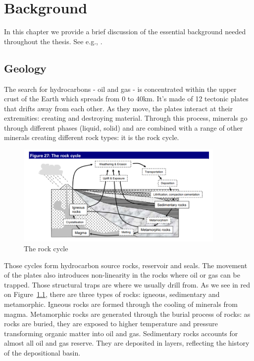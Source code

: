\chapter{Background}
\label{chp:background}

In this chapter we provide a brief discussion of the essential background needed throughout the thesis. See e.g., \cite{Cover2006}.


\section{Geology}
The search for hydrocarbons - oil and gas - is concentrated within the upper crust of the Earth which spreads from 0 to 40km. It's made of 12 tectonic plates that drifts away from each other. As they move, the plates interact at their extremities: creating and destroying material. Through this process, minerals go through different phases (liquid, solid) and are combined with a range of other minerals creating different rock types: it is the rock cycle. 
	\begin{figure}[!htp]
    \centering
        \includegraphics[width=0.9\textwidth]{./figures/02-rock-cycle}
        \caption{The rock cycle}\label{fig:rock-cycle}
    \end{figure}

Those cycles form hydrocarbon source rocks, reservoir and seals. The movement of the plates also introduces non-linearity in the rocks where oil or gas can be trapped. Those structural traps are where we usually drill from. As we see in red on Figure~\ref{fig:rock-cycle}, there are three types of rocks: igneous, sedimentary and metamorphic.  Igneous rocks are formed through the cooling of minerals from magma. Metamorphic rocks are generated through the burial process of rocks: as rocks are buried, they are exposed to higher temperature and pressure transforming organic matter into oil and gas. Sedimentary rocks accounts for almost all oil and gas reserve. They are deposited in layers, reflecting the history of the depositional basin.


